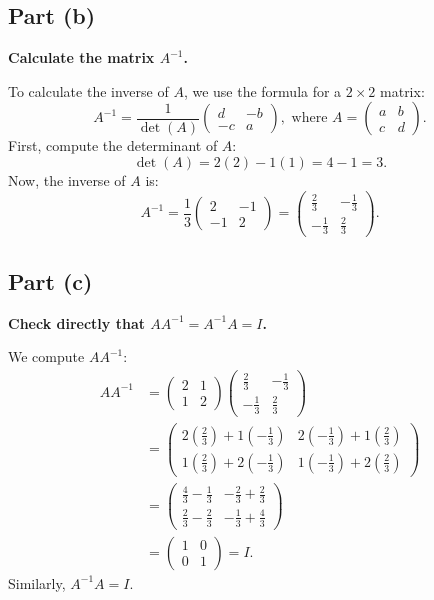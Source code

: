 \documentclass[11pt]{article}
\begin{document}
\newpage

\subsection{Part (b)}
\textbf{Calculate the matrix $A^{-1}$.}

To calculate the inverse of $A$, we use the formula for a $2 \times 2$ matrix:
\[
A^{-1} = \frac{1}{\det(A)} \begin{pmatrix} d & -b \\ -c & a \end{pmatrix}, \text{ where } A = \begin{pmatrix} a & b \\ c & d \end{pmatrix}.
\]
First, compute the determinant of $A$:
\[
\det(A) = 2(2) - 1(1) = 4 - 1 = 3.
\]
Now, the inverse of $A$ is:
\[
A^{-1} = \frac{1}{3} \begin{pmatrix} 2 & -1 \\ -1 & 2 \end{pmatrix}
= \begin{pmatrix} \frac{2}{3} & -\frac{1}{3} \\ -\frac{1}{3} & \frac{2}{3} \end{pmatrix}.
\]

\newpage

\subsection{Part (c)}
\textbf{Check directly that $AA^{-1} = A^{-1}A = I$.}

We compute $AA^{-1}$:
\begin{align*}
AA^{-1} &= \begin{pmatrix} 2 & 1 \\ 1 & 2 \end{pmatrix} \begin{pmatrix} \frac{2}{3} & -\frac{1}{3} \\ -\frac{1}{3} & \frac{2}{3} \end{pmatrix} \\
&= \begin{pmatrix} 2\left(\frac{2}{3}\right) + 1\left(-\frac{1}{3}\right) & 2\left(-\frac{1}{3}\right) + 1\left(\frac{2}{3}\right) \\
1\left(\frac{2}{3}\right) + 2\left(-\frac{1}{3}\right) & 1\left(-\frac{1}{3}\right) + 2\left(\frac{2}{3}\right) \end{pmatrix} \\
&= \begin{pmatrix} \frac{4}{3} - \frac{1}{3} & -\frac{2}{3} + \frac{2}{3} \\
\frac{2}{3} - \frac{2}{3} & -\frac{1}{3} + \frac{4}{3} \end{pmatrix} \\
&= \begin{pmatrix} 1 & 0 \\ 0 & 1 \end{pmatrix} = I.
\end{align*}
Similarly, $A^{-1}A = I$.
\end{document}
